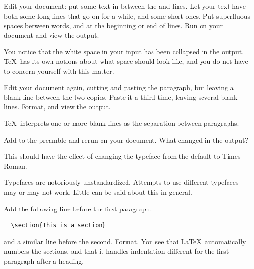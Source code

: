 \begin{exercise}
Edit your document: put some text in between the 
 and  lines.
Let your text have both some long lines that go on for a while,
and some short ones. Put superfluous spaces between words, and at the
beginning or end of lines. Run  on your document and view
the output.
\end{exercise}
\begin{outcome}
{You notice that the white space in your input has been collapsed in the
output. \TeX\ has its own notions about what space should look like,
and you do not have to concern yourself with this matter.}
\end{outcome}

\begin{exercise}
Edit your document again, cutting and pasting the
paragraph, but leaving a blank line between the two copies. Paste it
a third time, leaving several blank lines. Format, and view the
output.
\end{exercise}
\begin{outcome}
{\TeX\ interprets one or more blank lines as the
separation between paragraphs.}
\end{outcome}

\begin{exercise}
Add  to the preamble and rerun
 on your
document. What changed in the output?
\end{exercise}
\begin{outcome}
{This should have the effect of changing the typeface from the default
to Times Roman.}
\end{outcome}
\begin{caution}
{Typefaces are notoriously unstandardized. Attempts to use different
typefaces may or may not work. Little can be said about this in general.}
\end{caution}

Add the following line before the first paragraph:
\begin{verbatim}
  \section{This is a section}
\end{verbatim}
and a similar line before the
second. Format. You see that \LaTeX\ automatically numbers the
sections, and that it handles indentation different for the first
paragraph after a heading.

